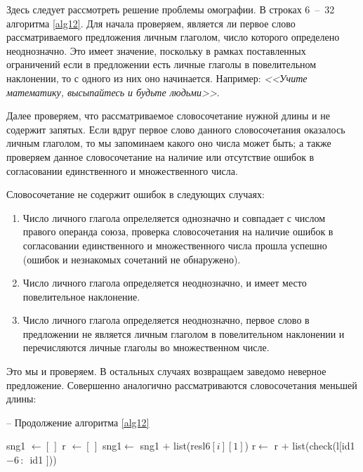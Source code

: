 \documentclass[main]{subfiles}
\begin{document}
Здесь следует рассмотреть решение проблемы омографии. В строках 6~--~32 алгоритма \ref{alg12}. Для начала проверяем, является ли первое слово рассматриваемого предложения личным глаголом, число которого определено неоднозначно. Это имеет значение, поскольку в рамках поставленных ограничений если в предложении есть личные глаголы в повелительном наклонении, то с одного из них оно начинается. Например: \textit{<<Учите математику, высыпайтесь и будьте людьми>>}.

Далее проверяем, что рассматриваемое словосочетание нужной длины и не содержит запятых. Если вдруг первое слово данного словосочетания оказалось личным глаголом, то мы запоминаем какого оно числа может быть; а также проверяем данное словосочетание на наличие или отсутствие ошибок в согласовании единственного и множественного числа.

Словосочетание не содержит ошибок в следующих случаях:\begin{enumerate}
	\item Число личного глагола опрелеляется однозначно и совпадает с числом правого операнда союза, проверка словосочетания на наличие ошибок в согласовании единственного и множественного числа прошла успешно (ошибок и незнакомых сочетаний не обнаружено).
	\item Число личного глагола определяется неоднозначно, и имеет место повелительное наклонение.
	\item Число личного глагола определяется неоднозначно, первое слово в предложении не является личным глаголом в повелительном наклонении и перечисляются личные глаголы во множественном числе.
\end{enumerate}

Это мы и проверяем. В остальных случаях возвращаем заведомо неверное предложение. Совершенно аналогично рассматриваются словосочетания меньшей длины:

\begin{algorithm}
	\caption{-- Продолжение алгоритма \ref{alg12}}\label{alg13}
	\begin{algorithmic}[1]
		\State sng1 $\gets [\, ]$ 
		\State r $\gets [\, ]$ 
		\State sng1$\gets$ sng1 $+$ list(resl6$[i][1]$)
		\State r$\gets$ r $+$ list(check(l$[$id1$-6\, :\, $ id1 $]$))
		\EndIf
		\EndFor
	\end{algorithmic}
\end{algorithm}
\end{document}
